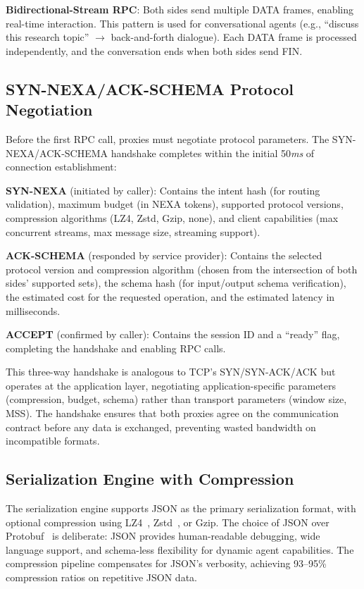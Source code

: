 \textbf{Bidirectional-Stream RPC}: Both sides send multiple DATA frames, enabling real-time interaction. This pattern is used for conversational agents (e.g., ``discuss this research topic'' $\rightarrow$ back-and-forth dialogue). Each DATA frame is processed independently, and the conversation ends when both sides send FIN.

\subsection{SYN-NEXA/ACK-SCHEMA Protocol Negotiation}

Before the first RPC call, proxies must negotiate protocol parameters. The SYN-NEXA/ACK-SCHEMA handshake completes within the initial 50\textit{ms} of connection establishment:

\textbf{SYN-NEXA} (initiated by caller): Contains the intent hash (for routing validation), maximum budget (in NEXA tokens), supported protocol versions, compression algorithms (LZ4, Zstd, Gzip, none), and client capabilities (max concurrent streams, max message size, streaming support).

\textbf{ACK-SCHEMA} (responded by service provider): Contains the selected protocol version and compression algorithm (chosen from the intersection of both sides' supported sets), the schema hash (for input/output schema verification), the estimated cost for the requested operation, and the estimated latency in milliseconds.

\textbf{ACCEPT} (confirmed by caller): Contains the session ID and a ``ready'' flag, completing the handshake and enabling RPC calls.

This three-way handshake is analogous to TCP's SYN/SYN-ACK/ACK but operates at the application layer, negotiating application-specific parameters (compression, budget, schema) rather than transport parameters (window size, MSS). The handshake ensures that both proxies agree on the communication contract before any data is exchanged, preventing wasted bandwidth on incompatible formats.

\subsection{Serialization Engine with Compression}

The serialization engine supports JSON as the primary serialization format, with optional compression using LZ4~\cite{lz42014}, Zstd~\cite{zstd2016}, or Gzip. The choice of JSON over Protobuf~\cite{protobuf2022} is deliberate: JSON provides human-readable debugging, wide language support, and schema-less flexibility for dynamic agent capabilities. The compression pipeline compensates for JSON's verbosity, achieving 93--95\% compression ratios on repetitive JSON data.

